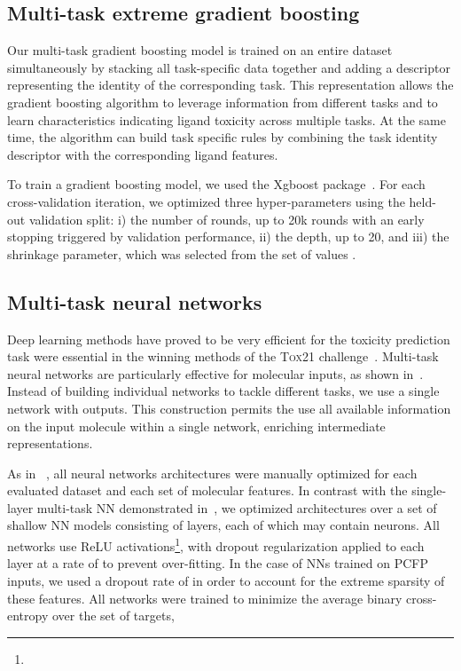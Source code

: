 \documentclass[11pt,a4paper]{article}
\begin{document}
\subsection{Multi-task extreme gradient boosting}
Our multi-task gradient boosting model is trained on an 
entire dataset simultaneously by stacking all task-specific data 
together and adding a descriptor representing the identity of the
corresponding task. This representation allows the gradient boosting algorithm to
leverage information from different tasks and to learn characteristics indicating ligand
toxicity across multiple tasks. At the same time, the algorithm can build task
specific rules by combining the task identity descriptor with the corresponding ligand
features. 

To train a gradient boosting model, we used the Xgboost package~\cite{Chen2016}.
For each cross-validation iteration, we optimized three hyper-parameters 
using the held-out validation split: 
i) the number of rounds, up to 20k rounds with
an early stopping triggered by validation performance, 
ii) the depth, up to 20, 
and  iii) the shrinkage parameter, which was selected from the set
of values .

\subsection{Multi-task neural networks}
Deep learning methods have proved to be very efficient for the toxicity prediction task
were essential in the winning methods of 
the \textsc{Tox21} challenge~\cite{Mayr:2016aa,Capuzzi:2016aa}. 
Multi-task neural networks are particularly effective for molecular
inputs, as shown in~\cite{Ramsundar:2015aa}. Instead of building  individual
networks to tackle  different tasks, we use a single network with  outputs. 
This construction permits the use all available information on the input 
molecule within a single network, enriching intermediate representations.

As in ~\cite{Mayr:2016aa}, all neural networks architectures were manually 
optimized for each evaluated dataset and each set of molecular features.
In contrast with the single-layer multi-task NN demonstrated in~\cite{Duvenaud:2015aa},
we optimized architectures over a set of shallow NN models 
consisting of  layers, each of which may contain 
 neurons. 
All networks use ReLU activations\footnote{}, 
with dropout regularization applied to each layer at a rate of  to
prevent over-fitting.
In the case of NNs trained on PCFP inputs, we used a dropout rate of 
in order to account for the extreme sparsity of these features.
All networks were trained to minimize the average binary cross-entropy 
over the set of  targets,
\end{document}
